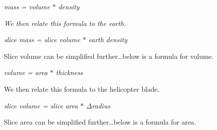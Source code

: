 \documentclass[a4paper, 11pt, oneside]{book} %
\begin{document}
\textit{mass = volume $*$ density}\\

\vspace{0.5\baselineskip} %
\vspace{0.5\baselineskip} %

\textit{We then relate this formula to the earth.}\\

\vspace{0.5\baselineskip} %
\vspace{0.5\baselineskip} %

\textit{slice mass = slice volume $*$ earth density}\\

\vspace{0.5\baselineskip} %
\vspace{0.5\baselineskip} %

Slice volume can be simplified further\dots below is a formula for volume.\\

\vspace{0.5\baselineskip} %
\vspace{0.5\baselineskip} %

\textit{volume = area $*$ thickness}\\

\vspace{0.5\baselineskip} %
\vspace{0.5\baselineskip} %

We then relate this formula to the helicopter blade.\\

\vspace{0.5\baselineskip} %
\vspace{0.5\baselineskip} %

\textit{slice volume = slice area $*$  $\Delta$radius}\\

\vspace{0.5\baselineskip} %
\vspace{0.5\baselineskip} %

Slice area can be simplified further\dots below is a formula for area.\\
\end{document}
